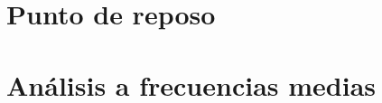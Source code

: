 \section{Punto de reposo}
\resetallcounters

\cleardoublepage

\section{Análisis a frecuencias medias}
\resetallcounters

\cleardoublepage

